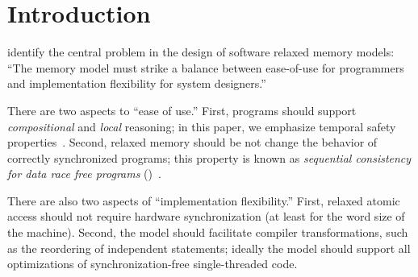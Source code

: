 \section{Introduction}
\label{sec:intro}
\citet{Manson:2005:JMM:1047659.1040336} identify the central problem in the
design of software relaxed memory models: ``The memory model must strike a
balance between ease-of-use for programmers and implementation flexibility
for system designers.''  


There are two aspects to ``ease of use.''  First, programs should support
\emph{compositional} and \emph{local} reasoning; in this paper, we emphasize
temporal safety
properties~\cite{PnueliSafety,Misra:1981:PNP:1313338.1313770,StarkSafety,Abadi:1993:CS:151646.151649}.
Second, relaxed memory should be not change the behavior of correctly
synchronized programs; this property is known as \emph{sequential consistency
  for data race free programs} (\drfsc)~\cite{DBLP:journals/tpds/AdveH93,
  DBLP:conf/isca/AdveH90}.


There are also two aspects of ``implementation flexibility.''  First, relaxed
atomic access should not require hardware synchronization (at least for the
word size of the machine).  Second, the model
should facilitate compiler transformations, such as the reordering of independent
statements; ideally the model should support all %
optimizations of
synchronization\hyp{}free single\hyp{}threaded code.

